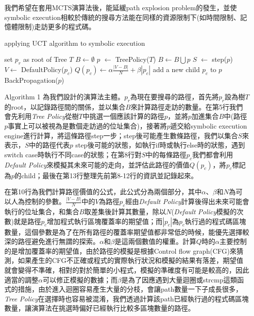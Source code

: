 \documentclass[12pt,a4paper,oneside]{book}
\begin{document}
我們希望在套用MCTS演算法後，能延緩path explosion problem的發生，並使symbolic execution相較於傳統的搜尋方法能在同樣的資源限制下(如時間限制、記憶體限制)走訪更多的程式碼。

\begin{algorithm}[htbp]
  \caption{applying UCT algorithm to symbolic execution}
  \begin{algorithmic}[1]
    \State set $p_r$ as root of Tree $T$
    \State $B \leftarrow \emptyset$
      \State $p$ $\leftarrow$ TreePolicy($T$)
      \State $B \leftarrow B \bigcup p$
      \State $S$ $\leftarrow$ step($p$)
      	\State $V \leftarrow$ DefaultPolicy($p_c$)
        \State $Q(p_c) \leftarrow \alpha \frac{|V-B|}{N} + \beta|p_c|$
        \State add a new child $p_c$ to $p$
      \EndFor
      \State BackPropagation($p$)
    \EndWhile
    \EndFunction
  \end{algorithmic}
\end{algorithm}

Algorithm 1 為我們設計的演算法主體。$p_r$為現在要搜尋的路徑，首先將$p_r$設為樹$T$的root，以記錄路徑間的關係，並以集合$B$來計算路徑走訪的數量。在第5行我們會先利用\textit{Tree Policy}從樹$T$中挑選一個應該計算的路徑$p$，並將$p$加進集合$B$中(路徑$p$事實上可以被視為是數個走訪過的位址集合)，接著將$p$遞交給symbolic execution engine進行計算，將這條路徑step一步；step後可能產生數條路徑，我們以集合$S$來表示，$S$中的路徑代表$p$ step後可能的狀態，如執行if時或執行else時的狀態，遇到switch case時執行不同case的狀態；在第8行對$S$中的每條路徑$p_c$我們都會利用\textit{Default Policy}來模擬其未來可能的走向，並評估此路徑的價值$Q(p_c)$，將$p_c$標記為$p$的child；最後在第13行整理先前第8-12行的資訊並記錄起來。

在第10行為我們計算路徑價值的公式，此公式分為兩個部分，其中$\alpha$、$\beta$和$N$為可以人為控制的參數。$\frac{|V-B|}{N}$中的$V$為路徑$p_c$經由\textit{Default Policy}計算後得出未來可能會執行的位址集合，和集合$B$取差集後計算其數量，除以$N$(\textit{Default Policy}模擬的次數)就是路徑$p_c$增加程式執行區塊覆蓋率的期望值；而$|p_c|$為$p_c$執行過的程式碼區塊數量，這個參數是為了在所有路徑的覆蓋率期望值都非常低的時候，能優先選擇較深的路徑避免進行無謂的探索。$\alpha$和$\beta$是這兩個數值的權重。計算$Q$時的$\alpha$主要控制的是增加覆蓋率的期望值，由於路徑的模擬是根據Control flow graph(CFG)來猜測，如果產生的CFG不正確或程式的實際執行狀況和模擬的結果有落差，期望值就會變得不準確，相對的對於簡單的小程式，模擬的準確度有可能是較高的，因此適當的調整$\alpha$可以修正模擬的數據；而$\beta$是為了因應遇到大量迴圈或strcmp這類函式的措施，由於進入迴圈容易產生大量的分枝，會讓path數量一下子成長很多，\textit{Tree Policy}在選擇時也容易被混淆，我們透過計算該path已經執行過的程式碼區塊數量，讓演算法在挑選時偏好已經執行比較多區塊數量的路徑。
\end{document}
